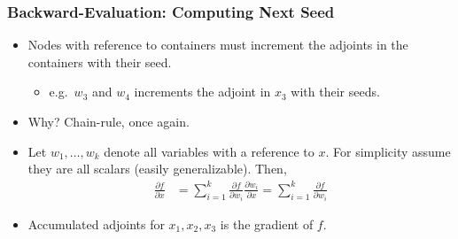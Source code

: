 \begin{frame}
\frametitle{Backward-Evaluation: Computing Next Seed}
\begin{itemize}

\item Nodes with reference to containers must increment 
    the adjoints in the containers with their seed.
    \begin{itemize}
        \item e.g.\ $w_3$ and $w_4$ increments the adjoint in $x_3$ with their seeds.
    \end{itemize}

\item Why? Chain-rule, once again.

\item Let $w_1, \ldots, w_k$ denote all variables with a reference to $x$.
    For simplicity assume they are all scalars (easily generalizable).
    Then,
    \begin{align*}
        \frac{\partial f}{\partial x} 
        &=  \sum\limits_{i=1}^k
            \frac{\partial f}{\partial w_{i}} \frac{\partial w_{i}}{\partial x}
        =   \sum\limits_{i=1}^k
            \frac{\partial f}{\partial w_{i}}
    \end{align*}

\item Accumulated adjoints for $x_1, x_2, x_3$ is the gradient of $f$.

\end{itemize}
\end{frame}

